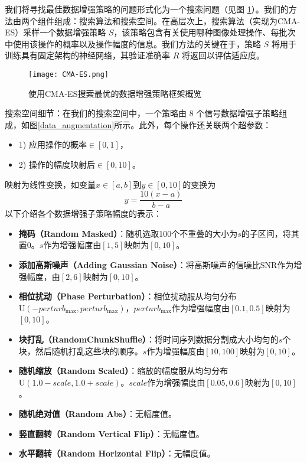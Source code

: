 \documentclass[master]{thesis-uestc}
\begin{document}
我们将寻找最佳数据增强策略的问题形式化为一个搜索问题（见图 \ref{CMA-ES}）。我们的方法由两个组件组成：搜索算法和搜索空间。在高层次上，搜索算法（实现为CMA-ES）采样一个数据增强策略 \( S \)，该策略包含有关使用哪种图像处理操作、每批次中使用该操作的概率以及操作幅度的信息。我们方法的关键在于，策略 \( S \) 将用于训练具有固定架构的神经网络，其验证准确率 \( R \) 将返回以评估适应度。
\begin{figure}[h]
    \centering
    \texttt{[image: CMA-ES.png]}
    \caption{使用CMA-ES搜索最优的数据增强策略框架概览}
    \label{CMA-ES}
\end{figure}
搜索空间细节：在我们的搜索空间中，一个策略由 8 个信号数据增强子策略组成，如图\ref{data_augmentation}所示。此外，每个操作还关联两个超参数：
\begin{itemize}
    \item 1) 应用操作的概率\(\in [0,1]\)，
    \item 2) 操作的幅度映射后\(\in [0,10]\)。
\end{itemize}
映射为线性变换，如变量\(x \in [a,b]\)到\(y \in [0,10]\)的变换为
\begin{equation}
    y = \frac{10(x - a)}{b - a}
    \end{equation}
以下介绍各个数据增强子策略幅度的表示：
\begin{itemize}
    \item \textbf{掩码（Random Masked）}：随机选取100个不重叠的大小为$s$的子区间，将其置0。$s$作为增强幅度由\([1,5]\)映射为\([0,10]\)。

    \item \textbf{添加高斯噪声（Adding Gaussian Noise）}：将高斯噪声的信噪比SNR作为增强幅度，由\([2,6]\)映射为\([0,10]\)。

    \item \textbf{相位扰动（Phase Perturbation）}：相位扰动服从均匀分布$\text{U}(-perturb_{\text{max}}, perturb_{\text{max}})$，$perturb_{\text{max}}$作为增强幅度由\([0.1,0.5]\)映射为\([0,10]\)。

    \item \textbf{块打乱（RandomChunkShuffle）}：将时间序列数据分割成大小均匀的$s$个块，然后随机打乱这些块的顺序。$s$作为增强幅度由\([10,100]\)映射为\([0,10]\)。

    \item \textbf{随机缩放（Random Scaled）}：缩放的幅度服从均匀分布$\text{U}(1.0-scale, 1.0+scale)$。$scale$作为增强幅度由\([0.05,0.6]\)映射为\([0,10]\)。

    \item \textbf{随机绝对值（Random Abs）}：无幅度值。

    \item \textbf{竖直翻转（Random Vertical Flip）}：无幅度值。

    \item \textbf{水平翻转（Random Horizontal Flip）}：无幅度值。
    
\end{itemize}
\end{document}
